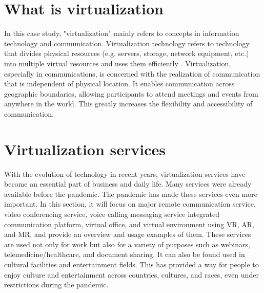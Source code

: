 \documentclass[12pt]{article}
\begin{document}
\section{What is virtualization}
In this case study, "virtualization" mainly refers to concepts in information
technology and communication. Virtualization technology refers to technology
that divides physical resources (e.g. servers, storage, network equipment,
etc.) into multiple virtual resources and uses them efficiently
\cite{virtualization_overview}.
Virtualization, especially in communications, is concerned with the realization
of communication that is independent of physical location. It enables
communication across geographic boundaries, allowing participants to attend
meetings and events from anywhere in the world. This greatly increases the
flexibility and accessibility of communication.

\newpage
\section{Virtualization services}
With the evolution of technology in recent years, virtualization services have
become an essential part of business and daily life. Many services were already
available before the pandemic. The pandemic has made these services even more
important. In this section, it will focus on major remote communication
service, video conferencing service, voice calling messaging service integrated
communication platform,
virtual office, and virtual environment using VR, AR, and MR, and provide an
overview and usage examples of them. These services are used not only for work
but also for a variety of purposes such as webinars, telemedicine/healthcare,
and document sharing. It can also be found used in cultural facilities and
entertainment fields. This has provided a way for people to enjoy culture and
entertainment across countries, cultures, and races, even under restrictions
during the pandemic.
\end{document}
